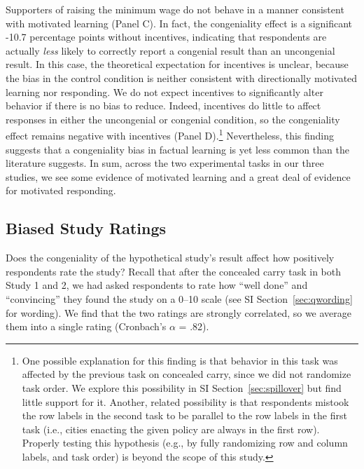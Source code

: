 \documentclass[12pt, letterpaper]{article}
\begin{document}
Supporters of raising the minimum wage do not behave in a manner consistent with motivated learning (Panel C). In fact, the congeniality effect is a significant -10.7 percentage points without incentives, indicating that respondents are actually {\it less} likely to correctly report a congenial result than an uncongenial result. In this case, the theoretical expectation for incentives is unclear, because the bias in the control condition is neither consistent with directionally motivated learning nor responding. We do not expect incentives to significantly alter behavior if there is no bias to reduce. Indeed, incentives do little to affect responses in either the uncongenial or congenial condition, so the congeniality effect remains negative with incentives (Panel D).\footnote{
One possible explanation for this finding is that behavior in this task was affected by the previous task on concealed carry, since we did not randomize task order. We explore this possibility in SI Section~\ref{sec:spillover} but find little support for it.
Another, related possibility is that respondents mistook the row labels in the second task to be parallel to the row labels in the first task (i.e., cities enacting the given policy are always in the first row). Properly testing this hypothesis (e.g., by fully randomizing row and column labels, and task order) is beyond the scope of this study.}
Nevertheless, this finding suggests that a congeniality bias in factual learning is yet less common than the literature suggests.
In sum, across the two experimental tasks in our three studies, we see some evidence of motivated learning and a great deal of evidence for motivated responding.

\subsection*{Biased Study Ratings}

Does the congeniality of the hypothetical study's result affect how positively respondents rate the study? Recall that after the concealed carry task in both Study 1 and 2, we had asked respondents to rate how ``well done'' and ``convincing'' they found the study on a 0--10 scale (see SI Section~\ref{sec:qwording} for wording). We find that the two ratings are strongly correlated, so we average them into a single rating (Cronbach's $\alpha$ = .82).
\end{document}
